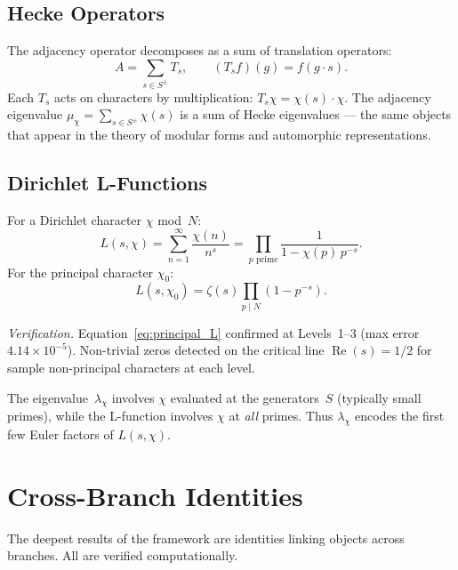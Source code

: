 \documentclass[12pt,reqno]{amsart}
\theoremstyle{plain}
\theoremstyle{definition}
\theoremstyle{remark}
\begin{document}
\subsection{Hecke Operators}

The adjacency operator decomposes as a sum of translation operators:
\begin{equation}\label{eq:hecke}
  A = \sum_{s \in S^\pm} T_s, \qquad (T_s f)(g) = f(g \cdot s).
\end{equation}
Each $T_s$ acts on characters by multiplication: $T_s \chi = \chi(s)
\cdot \chi$.  The adjacency eigenvalue $\mu_\chi = \sum_{s \in
S^\pm} \chi(s)$ is a sum of Hecke eigenvalues --- the same objects
that appear in the theory of modular forms and automorphic
representations.

\subsection{Dirichlet L-Functions}

For a Dirichlet character $\chi$ mod~$N$:
\begin{equation}\label{eq:dirichlet_L}
  L(s, \chi)
  = \sum_{n=1}^\infty \frac{\chi(n)}{n^s}
  = \prod_{p \text{ prime}} \frac{1}{1 - \chi(p)\, p^{-s}}.
\end{equation}
For the principal character $\chi_0$:
\begin{equation}\label{eq:principal_L}
  L(s, \chi_0) = \zeta(s) \prod_{p \mid N} (1 - p^{-s}).
\end{equation}

\emph{Verification.}  Equation~\eqref{eq:principal_L} confirmed at
Levels~1--3 (max error $4.14 \times 10^{-5}$).  Non-trivial zeros
detected on the critical line $\operatorname{Re}(s) = 1/2$ for sample
non-principal characters at each level.

The eigenvalue~$\lambda_\chi$ involves $\chi$ evaluated at the
generators~$S$ (typically small primes), while the L-function involves
$\chi$ at \emph{all} primes.  Thus $\lambda_\chi$ encodes the first
few Euler factors of $L(s, \chi)$.


\section{Cross-Branch Identities}\label{sec:cross}

The deepest results of the framework are identities linking objects
across branches.  All are verified computationally.
\end{document}
